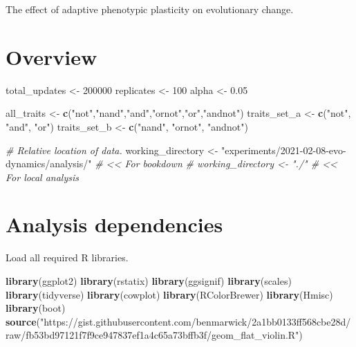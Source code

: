 \documentclass[]{book}
\newenvironment{Shaded}{\begin{snugshade}}{\end{snugshade}}
\newcommand{\CommentTok}[1]{\textcolor[rgb]{0.56,0.35,0.01}{\textit{#1}}}
\newcommand{\DecValTok}[1]{\textcolor[rgb]{0.00,0.00,0.81}{#1}}
\newcommand{\FloatTok}[1]{\textcolor[rgb]{0.00,0.00,0.81}{#1}}
\newcommand{\KeywordTok}[1]{\textcolor[rgb]{0.13,0.29,0.53}{\textbf{#1}}}
\newcommand{\NormalTok}[1]{#1}
\newcommand{\StringTok}[1]{\textcolor[rgb]{0.31,0.60,0.02}{#1}}
\begin{document}
The effect of adaptive phenotypic plasticity on evolutionary change.

\hypertarget{overview-1}{%
\section{Overview}\label{overview-1}}

\begin{Shaded}
\begin{Highlighting}[]
\NormalTok{total_updates <-}\StringTok{ }\DecValTok{200000}
\NormalTok{replicates <-}\StringTok{ }\DecValTok{100}
\NormalTok{alpha <-}\StringTok{ }\FloatTok{0.05}

\NormalTok{all_traits <-}\StringTok{ }\KeywordTok{c}\NormalTok{(}\StringTok{"not"}\NormalTok{,}\StringTok{"nand"}\NormalTok{,}\StringTok{"and"}\NormalTok{,}\StringTok{"ornot"}\NormalTok{,}\StringTok{"or"}\NormalTok{,}\StringTok{"andnot"}\NormalTok{)}
\NormalTok{traits_set_a <-}\StringTok{ }\KeywordTok{c}\NormalTok{(}\StringTok{"not"}\NormalTok{, }\StringTok{"and"}\NormalTok{, }\StringTok{"or"}\NormalTok{)}
\NormalTok{traits_set_b <-}\StringTok{ }\KeywordTok{c}\NormalTok{(}\StringTok{"nand"}\NormalTok{, }\StringTok{"ornot"}\NormalTok{, }\StringTok{"andnot"}\NormalTok{)}

\CommentTok{# Relative location of data.}
\NormalTok{working_directory <-}\StringTok{ "experiments/2021-02-08-evo-dynamics/analysis/"} \CommentTok{# << For bookdown}
\CommentTok{# working_directory <- "./"                                              # << For local analysis}
\end{Highlighting}
\end{Shaded}

\hypertarget{analysis-dependencies-1}{%
\section{Analysis dependencies}\label{analysis-dependencies-1}}

Load all required R libraries.

\begin{Shaded}
\begin{Highlighting}[]
\KeywordTok{library}\NormalTok{(ggplot2)}
\KeywordTok{library}\NormalTok{(rstatix)}
\KeywordTok{library}\NormalTok{(ggsignif)}
\KeywordTok{library}\NormalTok{(scales)}
\KeywordTok{library}\NormalTok{(tidyverse)}
\KeywordTok{library}\NormalTok{(cowplot)}
\KeywordTok{library}\NormalTok{(RColorBrewer)}
\KeywordTok{library}\NormalTok{(Hmisc)}
\KeywordTok{library}\NormalTok{(boot)}
\KeywordTok{source}\NormalTok{(}\StringTok{"https://gist.githubusercontent.com/benmarwick/2a1bb0133ff568cbe28d/raw/fb53bd97121f7f9ce947837ef1a4c65a73bffb3f/geom_flat_violin.R"}\NormalTok{)}
\end{Highlighting}
\end{Shaded}
\end{document}

